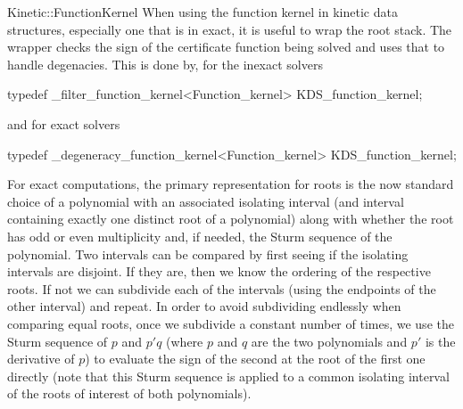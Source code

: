 \begin{ccRefConcept}{Kinetic::FunctionKernel}
When using the function kernel in kinetic data structures, especially
one that is in exact, it is useful to wrap the root stack. The wrapper
checks the sign of the certificate function being solved and uses that
to handle degenacies. This is done by, for the inexact solvers 
\begin{ccExampleCode}
typedef _filter_function_kernel<Function_kernel> KDS_function_kernel;
\end{ccExampleCode}
and for exact solvers
\begin{ccExampleCode}
typedef _degeneracy_function_kernel<Function_kernel> KDS_function_kernel;
\end{ccExampleCode}

For exact computations, the primary representation for roots is the
now standard choice of a polynomial with an associated isolating
interval (and interval containing exactly one distinct root of a
polynomial) along with whether the root has odd or even multiplicity
and, if needed, the Sturm sequence of the polynomial. Two intervals
can be compared by first seeing if the isolating intervals are
disjoint. If they are, then we know the ordering of the respective
roots. If not we can subdivide each of the intervals (using the
endpoints of the other interval) and repeat. In order to avoid
subdividing endlessly when comparing equal roots, once we subdivide a
constant number of times, we use the Sturm sequence of $p$ and $p'q$
(where $p$ and $q$ are the two polynomials and $p'$ is the derivative
of $p$) to evaluate the sign of the second at the root of the first
one directly (note that this Sturm sequence is applied to a common
isolating interval of the roots of interest of both polynomials).



\end{ccRefConcept}



